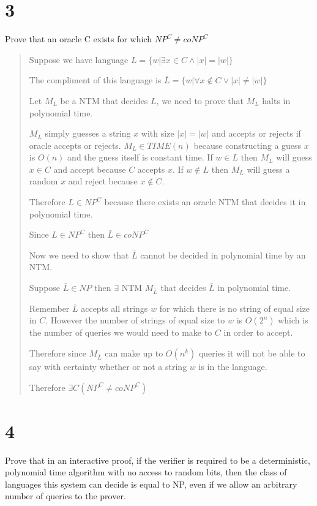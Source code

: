 \documentclass[
  letterpaper,
  DIV=11,
  numbers=noendperiod]{scrartcl}
\begin{document}
\section{3}\label{section-2}

Prove that an oracle C exists for which \(NP^C \neq coNP^C\)

\begin{quote}
Suppose we have language \(L=\{w|\exists x \in C \land |x|=|w|\}\)

The compliment of this language is
\(\bar L = \{w|\forall  x\notin C \lor |x| \neq |w|\}\)

Let \(M_L\) be a NTM that decides \(L\), we need to prove that \(M_L\)
halts in polynomial time.

\(M_L\) simply guesses a string \(x\) with size \(|x|=|w|\) and accepts
or rejects if oracle accepts or rejects. \(M_L\in TIME(n)\) because
constructing a guess \(x\) is \(O(n)\) and the guess itself is constant
time. If \(w\in L\) then \(M_L\) will guess \(x\in C\) and accept
because \(C\) accepts \(x\). If \(w\notin L\) then \(M_L\) will guess a
random \(x\) and reject because \(x\notin C\).

Therefore \(L\in NP^C\) because there exists an oracle NTM that decides
it in polynomial time.

Since \(L\in NP^C\) then \(\bar L \in coNP^C\)

Now we need to show that \(\bar L\) cannot be decided in polynomial time
by an NTM.

Suppose \(\bar L\in NP\) then \(\exists\) NTM \(M_{\bar L}\) that
decides \(\bar L\) in polynomial time.

Remember \(\bar L\) accepts all strings \(w\) for which there is no
string of equal size in \(C\). However the number of strings of equal
size to \(w\) is \(O(2^n)\) which is the number of queries we would need
to make to \(C\) in order to accept.

Therefore since \(M_{\bar L}\) can make up to \(O(n^k)\) queries it will
not be able to say with certainty whether or not a string \(w\) is in
the language.

Therefore \(\exists C (NP^C\neq coNP^C)\)
\end{quote}

\section{4}\label{section-3}

Prove that in an interactive proof, if the verifier is required to be a
deterministic, polynomial time algorithm with no access to random bits,
then the class of languages this system can decide is equal to NP, even
if we allow an arbitrary number of queries to the prover.
\end{document}
